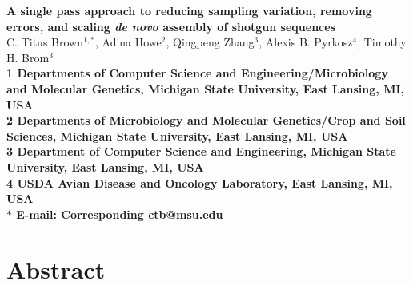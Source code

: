\documentclass[10pt]{article}
\date{}
\begin{document}
\begin{flushleft}
{\Large
\textbf{A single pass approach to reducing sampling variation, removing
errors, and scaling {\em de novo} assembly of shotgun sequences}}
\\
C. Titus Brown$^{1,\ast}$, 
Adina Howe$^{2}$,
Qingpeng Zhang$^{3}$,
Alexis B. Pyrkosz$^{4}$,
Timothy H. Brom$^{3}$
\\
\bf{1} Departments of Computer Science and Engineering/Microbiology and Molecular Genetics, Michigan State University, East Lansing, MI, USA
\\
\bf{2} Departments of Microbiology and Molecular Genetics/Crop and Soil Sciences, Michigan State University, East Lansing, MI, USA
\\
\bf{3} Department of Computer Science and Engineering, Michigan State University, East Lansing, MI, USA
\\
{\bf{4} USDA Avian Disease and Oncology Laboratory, East Lansing, MI, USA}
\\
$\ast$ E-mail: Corresponding ctb@msu.edu
\end{flushleft}

\section*{Abstract}
\end{document}
